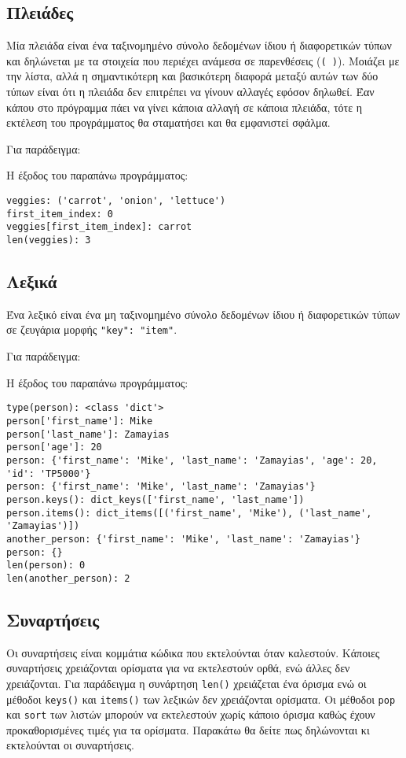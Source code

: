 \documentclass[14pt]{extreport}
\begin{document}
\subsection{Πλειάδες}
Μία πλειάδα είναι ένα ταξινομημένο σύνολο δεδομένων ίδιου ή διαφορετικών τύπων και δηλώνεται με τα στοιχεία που περιέχει ανάμεσα σε παρενθέσεις (\lstinline[language={}]{( )}). Μοιάζει με την λίστα, αλλά η σημαντικότερη και βασικότερη διαφορά μεταξύ αυτών των δύο τύπων είναι ότι η πλειάδα δεν επιτρέπει να γίνουν αλλαγές εφόσον δηλωθεί. Έαν κάπου στο πρόγραμμα πάει να γίνει κάποια αλλαγή σε κάποια πλειάδα, τότε η εκτέλεση του προγράμματος θα σταματήσει και θα εμφανιστεί σφάλμα.

Για παράδειγμα:



Η έξοδος του παραπάνω προγράμματος:

\begin{lstlisting}[language={}]
veggies: ('carrot', 'onion', 'lettuce')
first_item_index: 0
veggies[first_item_index]: carrot
len(veggies): 3
\end{lstlisting}



\newpage
\subsection{Λεξικά}
Ένα λεξικό είναι ένα μη ταξινομημένο σύνολο δεδομένων ίδιου ή διαφορετικών τύπων σε ζευγάρια μορφής \lstinline{"key": "item"}.

Για παράδειγμα:



Η έξοδος του παραπάνω προγράμματος:

\begin{lstlisting}[language={}]
type(person): <class 'dict'>
person['first_name']: Mike
person['last_name']: Zamayias
person['age']: 20
person: {'first_name': 'Mike', 'last_name': 'Zamayias', 'age': 20, 'id': 'TP5000'}
person: {'first_name': 'Mike', 'last_name': 'Zamayias'}
person.keys(): dict_keys(['first_name', 'last_name'])
person.items(): dict_items([('first_name', 'Mike'), ('last_name', 'Zamayias')])
another_person: {'first_name': 'Mike', 'last_name': 'Zamayias'}
person: {}
len(person): 0
len(another_person): 2
\end{lstlisting}

\newpage

\subsection{Συναρτήσεις}
Οι συναρτήσεις είναι κομμάτια κώδικα που εκτελούνται όταν καλεστούν. Κάποιες συναρτήσεις χρειάζονται ορίσματα για να εκτελεστούν ορθά, ενώ άλλες δεν χρειάζονται. Για παράδειγμα η συνάρτηση \lstinline{len()} χρειάζεται ένα όρισμα ενώ οι μέθοδοι \lstinline{keys()} και \lstinline{items()} των λεξικών δεν χρειάζονται ορίσματα. Οι μέθοδοι \lstinline{pop} και \lstinline{sort} των λιστών μπορούν να εκτελεστούν χωρίς κάποιο όρισμα καθώς έχουν προκαθορισμένες τιμές για τα ορίσματα. Παρακάτω θα δείτε πως δηλώνονται κι εκτελούνται οι συναρτήσεις.
\end{document}
